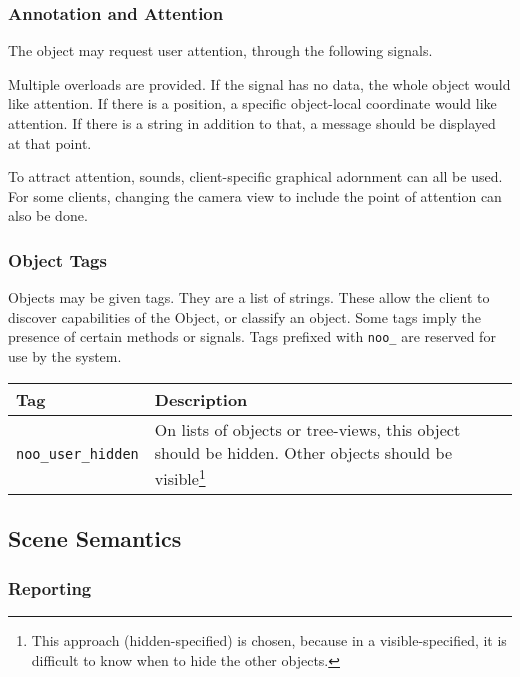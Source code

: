 \documentclass[11pt, oneside]{amsart}
\begin{document}
\subsubsection{Annotation and Attention}

The object may request user attention, through the following signals.



Multiple overloads are provided. If the signal has no data, the whole object would like attention. If there is a position, a specific object-local coordinate would like attention. If there is a string in addition to that, a message should be displayed at that point.

To attract attention, sounds, client-specific graphical adornment can all be used. For some clients, changing the camera view to include the point of attention can also be done.

\subsubsection{Object Tags}

Objects may be given tags. They are a list of strings. These allow the client to discover capabilities of the Object, or classify an object. Some tags imply the presence of certain methods or signals. Tags prefixed with \texttt{noo\_} are reserved for use by the system.

\begin{tabularx}{.9\textwidth}{p{1.5in}X}
	\toprule
	\textbf{Tag} & \textbf{Description} \\
	\midrule
	\texttt{noo\_user\_hidden} & On lists of objects or tree-views, this object should be hidden. Other objects should be visible\footnote{This approach (hidden-specified) is chosen, because in a visible-specified, it is difficult to know when to hide the other objects.} \\
	\bottomrule
\end{tabularx}

\subsection{Scene Semantics}


\subsubsection{Reporting}
\end{document}
